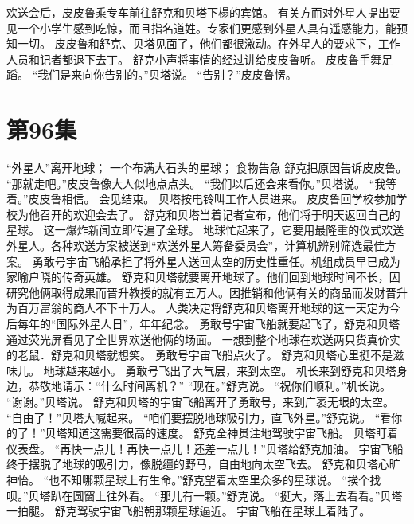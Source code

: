 \documentclass[a4paper,12pt,UTF8,twoside]{ctexbook}
\begin{document}
        欢送会后，皮皮鲁乘专车前往舒克和贝塔下榻的宾馆。 
        有关方而对外星人提出要见一个小学生感到吃惊，而且指名道姓。专家们更感到外星人具有遥感能力，能预知一切。 
        皮皮鲁和舒克、贝塔见面了，他们都很激动。在外星人的要求下，工作人员和记者都退下去丁。 
        舒克小声将事情的经过讲给皮皮鲁听。 
        皮皮鲁手舞足蹈。 
        “我们是来向你告别的。”贝塔说。 
        “告别？”皮皮鲁愣。   \chapter{第96集} 
        “外星人”离开地球； 
        一个布满大石头的星球； 
        食物告急   
        舒克把原因告诉皮皮鲁。 
        “那就走吧。”皮皮鲁像大人似地点点头。 
        “我们以后还会来看你。”贝塔说。 
        “我等着。”皮皮鲁相信。 
        会见结束。 
        贝塔按电铃叫工作人员进来。 
        皮皮鲁回学校参加学校为他召开的欢迎会去了。 
        舒克和贝塔当着记者宣布，他们将于明天返回自己的星球。 
        这一爆炸新闻立即传遍了全球。 
        地球忙起来了，它要用最隆重的仪式欢送外星人。各种欢送方案被送到“欢送外星人筹备委员会”，计算机辨别筛选最佳方案。 
        勇敢号宇宙飞船承担了将外星人送回太空的历史性重任。机组成员早已成为家喻户晓的传奇英雄。 
        舒克和贝塔就要离开地球了。他们回到地球时间不长，因研究他俩取得成果而晋升教授的就有五万人。因推销和他俩有关的商品而发财晋升为百万富翁的商人不下十万人。 
        人类决定将舒克和贝塔离开地球的这一天定为今后每年的“国际外星人日”，年年纪念。 
        勇敢号宇宙飞船就要起飞了，舒克和贝塔通过荧光屏看见了全世界欢送他俩的场面。 
        一想到整个地球在欢送两只货真价实的老鼠．舒克和贝塔就想笑。 
        勇敢号宇宙飞船点火了。 
        舒克和贝塔心里挺不是滋味儿。 
        地球越来越小。 
        勇敢号飞出了大气层，来到太空。 
        机长来到舒克和贝塔身边，恭敬地请示：“什么时间离机？” 
        “现在。”舒克说。 
        “祝你们顺利。”机长说。 
        “谢谢。”贝塔说。 
        舒克和贝塔的宇宙飞船离开了勇敢号，来到广袤无垠的太空。 
       “自由了！”贝塔大喊起来。 
        “咱们要摆脱地球吸引力，直飞外星。”舒克说。 
        “看你的了！”贝塔知道这需要很高的速度。 
        舒克全神贯注地驾驶宇宙飞船。 
        贝塔盯着仪表盘。 
        “再快一点儿！再快一点儿！还差一点儿！”贝塔给舒克加油。 
        宇宙飞船终于摆脱了地球的吸引力，像脱缰的野马，自由地向太空飞去。 
        舒克和贝塔心旷神怡。 
        “也不知哪颗星球上有生命。”舒克望着太空里众多的星球说。 
        “挨个找呗。”贝塔趴在圆窗上往外看。 
        “那儿有一颗。”舒克说。 
        “挺大，落上去看看。”贝塔一拍腿。 
        舒克驾驶宇宙飞船朝那颗星球逼近。 
        宇宙飞船在星球上着陆了。 
\end{document}
